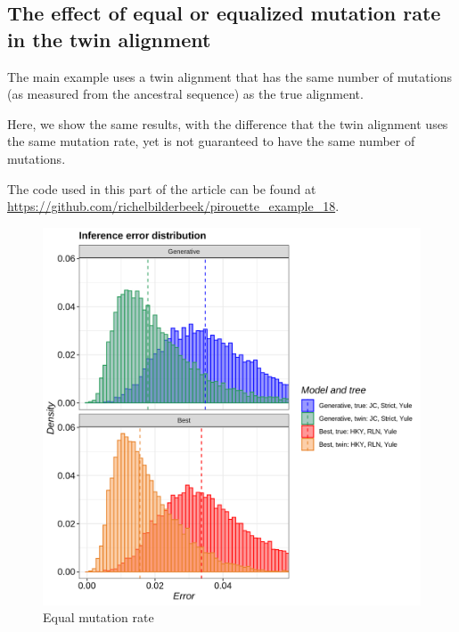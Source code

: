 \subsection{The effect of equal or equalized mutation rate in the twin alignment}
\label{subsec:different_n_mutations}

  
The main example uses a twin alignment that has the same number
of mutations (as measured from the ancestral sequence) as the true alignment.

Here, we show the same results, with the difference that
the twin alignment uses the same mutation rate, yet is not guaranteed
to have the same number of mutations.

The code used in this part of the article can be found at 
\url{https://github.com/richelbilderbeek/pirouette_example_18}.

\begin{figure}[H]
  \includegraphics[width=\textwidth]{pirouette_example_18/example_18/314/errors.png}
  \caption{Equal mutation rate}
\end{figure}

